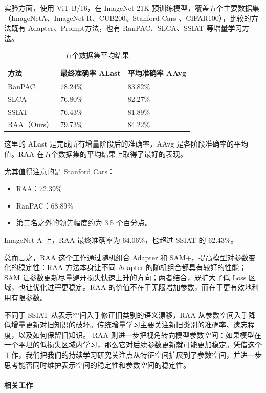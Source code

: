 实验方面，使用 ViT-B/16，在 ImageNet-21K 预训练模型，覆盖五个主要数据集（ImageNetA、ImageNet-R、CUB200、Stanford Cars 、CIFAR100），比较的方法既有 Adapter、Prompt方法，也有 RanPAC、SLCA、SSIAT 等增量学习方法。

\begin{table}[H]\centering
\caption*{五个数据集平均结果}
\begin{tabular}{lll}\toprule
\textbf{方法} & \textbf{最终准确率 ALast} & \textbf{平均准确率 AAvg} \\ \midrule
RanPAC & 78.24\% & 83.82\% \\
SLCA & 76.80\% & 82.27\% \\
SSIAT & 76.43\% & 81.89\% \\
RAA（Ours） & 79.73\% & 84.22\% \\
\bottomrule\end{tabular}
\end{table}

这里的 ALast 是完成所有增量阶段后的准确率，AAvg 是各阶段准确率的平均值。RAA 在五个数据集的平均结果上取得了最好的表现。

尤其值得注意的是 Stanford Cars：

\begin{itemize}
  \item RAA：72.39\%
  \item RanPAC：68.89\%
  \item 第二名之外的领先幅度约为 3.5 个百分点。
\end{itemize}

ImageNet-A 上，RAA 最终准确率为 64.06\%，也超过 SSIAT 的 62.43\%。

总而言之，RAA 这个工作通过随机组合 Adapter 和 SAM+，提高模型对参数变化的稳定性：RAA 方法本身让不同 Adapter 的随机组合都具有较好的性能；SAM 让参数更新尽量避开损失快速上升的方向；两者结合，既扩大了低 Loss 区域，也让优化过程更稳定。RAA 的价值不在于无限增加参数，而在于更有效地利用有限参数。

不同于 SSIAT 从表示空间入手修正旧类别的语义漂移，RAA 从参数空间入手降低增量更新对旧知识的破坏。传统增量学习主要关注新旧类别的准确率、遗忘程度，以及如何保留旧知识。 RAA 则进一步把视角转向模型参数空间：如果模型在一个平坦的低损失区域内学习，那么它对后续参数更新就可能更加稳定。凭借这个工作，我们把我们的持续学习研究关注点从特征空间扩展到了参数空间，并进一步思考能否同时维护表示空间的稳定性和参数空间的稳定性。

\paragraph{相关工作}

